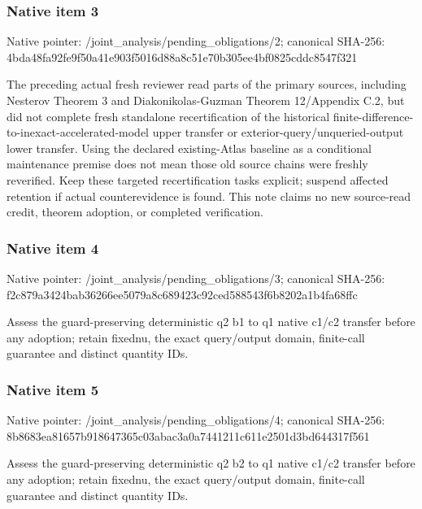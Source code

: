\documentclass[10pt,a4paper]{article}
\begin{document}
\subsubsection{Native item 3}
Native pointer: /joint\_\allowbreak{}analysis/pending\_\allowbreak{}obligations/2; canonical SHA-256: 4bda48fa92fe9f50a41e903f5016d88a8c51e70b305ee4bf0825cddc8547f321

\begingroup\raggedright\sloppy The preceding actual fresh reviewer read parts of the primary sources,\allowbreak{} including Nesterov Theorem 3 and Diakonikolas-Guzman Theorem 12/\allowbreak{}Appendix C.2,\allowbreak{} but did not complete fresh standalone recertification of the historical finite-difference-to-inexact-accelerated-model upper transfer or exterior-query/\allowbreak{}unqueried-output lower transfer. Using the declared existing-Atlas baseline as a conditional maintenance premise does not mean those old source chains were freshly reverified. Keep these targeted recertification tasks explicit;\allowbreak{} suspend affected retention if actual counterevidence is found. This note claims no new source-read credit,\allowbreak{} theorem adoption,\allowbreak{} or completed verification.\par\endgroup

\subsubsection{Native item 4}
Native pointer: /joint\_\allowbreak{}analysis/pending\_\allowbreak{}obligations/3; canonical SHA-256: f2c879a3424bab36266ee5079a8c689423c92ced588543f6b8202a1b4fa68ffc

\begingroup\raggedright\sloppy Assess the guard-preserving deterministic q2 b1 to q1 native c1/\allowbreak{}c2 transfer before any adoption;\allowbreak{} retain fixednu,\allowbreak{} the exact query/\allowbreak{}output domain,\allowbreak{} finite-call guarantee and distinct quantity IDs.\par\endgroup

\subsubsection{Native item 5}
Native pointer: /joint\_\allowbreak{}analysis/pending\_\allowbreak{}obligations/4; canonical SHA-256: 8b8683ea81657b918647365c03abac3a0a7441211c611e2501d3bd644317f561

\begingroup\raggedright\sloppy Assess the guard-preserving deterministic q2 b2 to q1 native c1/\allowbreak{}c2 transfer before any adoption;\allowbreak{} retain fixednu,\allowbreak{} the exact query/\allowbreak{}output domain,\allowbreak{} finite-call guarantee and distinct quantity IDs.\par\endgroup
\end{document}
